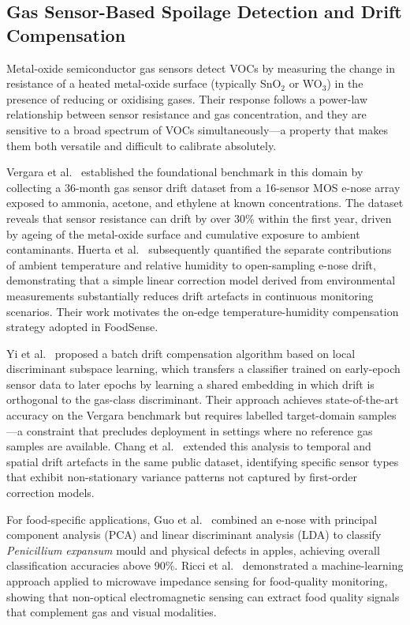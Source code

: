 \documentclass{ieeeaccess}
\begin{document}
\subsection{Gas Sensor-Based Spoilage Detection and Drift Compensation}

Metal-oxide semiconductor gas sensors detect VOCs by measuring the change in resistance of a heated metal-oxide surface (typically SnO$_2$ or WO$_3$) in the presence of reducing or oxidising gases. Their response follows a power-law relationship between sensor resistance and gas concentration, and they are sensitive to a broad spectrum of VOCs simultaneously---a property that makes them both versatile and difficult to calibrate absolutely.

Vergara et al.~\cite{Vergara2012} established the foundational benchmark in this domain by collecting a 36-month gas sensor drift dataset from a 16-sensor MOS e-nose array exposed to ammonia, acetone, and ethylene at known concentrations. The dataset reveals that sensor resistance can drift by over 30\% within the first year, driven by ageing of the metal-oxide surface and cumulative exposure to ambient contaminants. Huerta et al.~\cite{Huerta2016} subsequently quantified the separate contributions of ambient temperature and relative humidity to open-sampling e-nose drift, demonstrating that a simple linear correction model derived from environmental measurements substantially reduces drift artefacts in continuous monitoring scenarios. Their work motivates the on-edge temperature-humidity compensation strategy adopted in FoodSense.

Yi et al.~\cite{Yi2022} proposed a batch drift compensation algorithm based on local discriminant subspace learning, which transfers a classifier trained on early-epoch sensor data to later epochs by learning a shared embedding in which drift is orthogonal to the gas-class discriminant. Their approach achieves state-of-the-art accuracy on the Vergara benchmark but requires labelled target-domain samples---a constraint that precludes deployment in settings where no reference gas samples are available. Chang et al.~\cite{Chang2023} extended this analysis to temporal and spatial drift artefacts in the same public dataset, identifying specific sensor types that exhibit non-stationary variance patterns not captured by first-order correction models.

For food-specific applications, Guo et al.~\cite{Guo2020} combined an e-nose with principal component analysis (PCA) and linear discriminant analysis (LDA) to classify \textit{Penicillium expansum} mould and physical defects in apples, achieving overall classification accuracies above 90\%. Ricci et al.~\cite{Ricci2021} demonstrated a machine-learning approach applied to microwave impedance sensing for food-quality monitoring, showing that non-optical electromagnetic sensing can extract food quality signals that complement gas and visual modalities.
\end{document}
